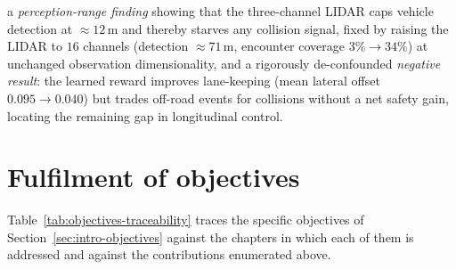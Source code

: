 \begin{enumerate}
        a \emph{perception-range finding} showing that the three-channel LIDAR caps vehicle
        detection at \(\approx12\,\mathrm{m}\) and thereby starves any collision signal, fixed
        by raising the LIDAR to \(16\) channels (detection \(\approx71\,\mathrm{m}\), encounter
        coverage \(3\%\rightarrow34\%\)) at unchanged observation dimensionality, and a
        rigorously de-confounded \emph{negative result}: the learned reward improves lane-keeping
        (mean lateral offset \(0.095\rightarrow0.040\)) but trades off-road events for collisions
        without a net safety gain, locating the remaining gap in longitudinal control.
\end{enumerate}

\section{Fulfilment of objectives}\label{sec:concl-objectives}

Table~\ref{tab:objectives-traceability} traces the specific objectives of
Section~\ref{sec:intro-objectives} against the chapters in which each of them is addressed and
against the contributions enumerated above.

